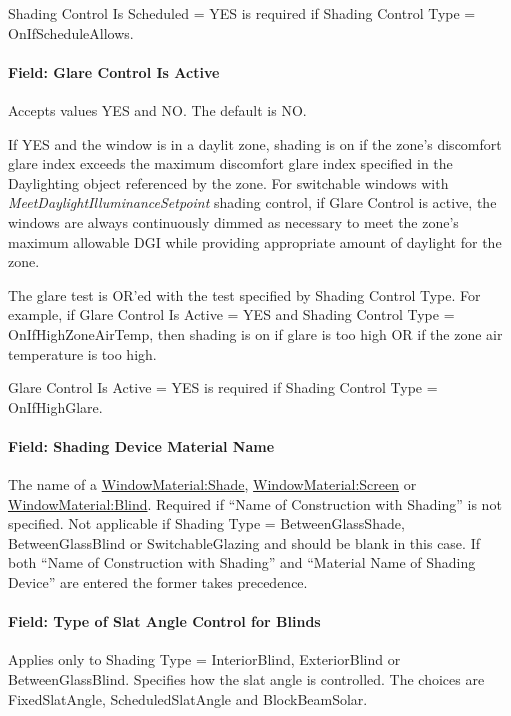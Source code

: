 Shading Control Is Scheduled = YES is required if Shading Control Type = OnIfScheduleAllows.

\paragraph{Field: Glare Control Is Active}\label{field-glare-control-is-active}

Accepts values YES and NO. The default is NO.

If YES and the window is in a daylit zone, shading is on if the zone's discomfort glare index exceeds the maximum discomfort glare index specified in the Daylighting object referenced by the zone. For switchable windows with \emph{MeetDaylightIlluminanceSetpoint} shading control, if Glare Control is active, the windows are always continuously dimmed as necessary to meet the zone's maximum allowable DGI while providing appropriate amount of daylight for the zone.

The glare test is OR'ed with the test specified by Shading Control Type. For example, if Glare Control Is Active = YES and Shading Control Type = OnIfHighZoneAirTemp, then shading is on if glare is too high OR if the zone air temperature is too high.

Glare Control Is Active = YES is required if Shading Control Type = OnIfHighGlare.

\paragraph{Field: Shading Device Material Name}\label{field-shading-device-material-name}

The name of a \hyperref[windowmaterialshade]{WindowMaterial:Shade}, \hyperref[windowmaterialscreen]{WindowMaterial:Screen} or \hyperref[windowmaterialblind]{WindowMaterial:Blind}. Required if ``Name of Construction with Shading'' is not specified. Not applicable if Shading Type = BetweenGlassShade, BetweenGlassBlind or SwitchableGlazing and should be blank in this case. If both ``Name of Construction with Shading'' and ``Material Name of Shading Device'' are entered the former takes precedence.

\paragraph{Field: Type of Slat Angle Control for Blinds}\label{field-type-of-slat-angle-control-for-blinds}

Applies only to Shading Type = InteriorBlind, ExteriorBlind or BetweenGlassBlind. Specifies how the slat angle is controlled. The choices are FixedSlatAngle, ScheduledSlatAngle and BlockBeamSolar.

